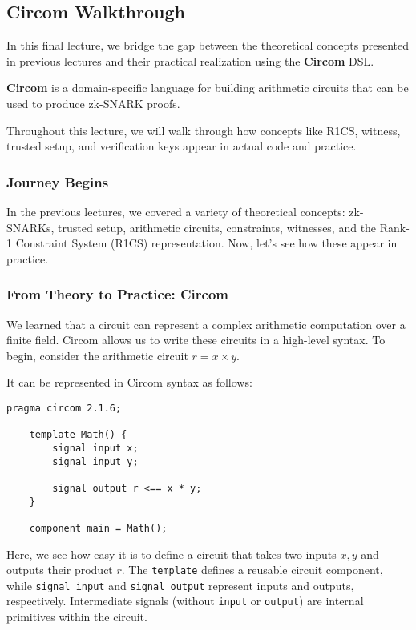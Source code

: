 \documentclass[../lecture-notes-105x135.tex]{subfiles}
\begin{document}
    \subsection{Circom Walkthrough}

    In this final lecture, we bridge the gap between the theoretical concepts presented in previous lectures and their practical realization using the \textbf{Circom} DSL.

    \begin{definition}
        \textbf{Circom} is a domain-specific language for building arithmetic circuits that can be used to produce zk-SNARK proofs.
    \end{definition}

    Throughout this lecture, we will walk through how concepts like R1CS, witness, trusted setup, and verification keys appear in actual code and practice.

    \subsubsection{Journey Begins}

    In the previous lectures, we covered a variety of theoretical concepts: zk-SNARKs, trusted setup, arithmetic circuits, constraints, witnesses, and the Rank-1 Constraint System (R1CS) representation.
    Now, let's see how these appear in practice.

    \subsubsection{From Theory to Practice: Circom}

    We learned that a circuit can represent a complex arithmetic computation over a finite field.
    Circom allows us to write these circuits in a high-level syntax.
    To begin, consider the arithmetic circuit $r = x \times y$.

    It can be represented in Circom syntax as follows:

    \begin{lstlisting}[language=Circom]
    pragma circom 2.1.6;

    template Math() {
        signal input x;
        signal input y;

        signal output r <== x * y;
    }

    component main = Math();
    \end{lstlisting}

    Here, we see how easy it is to define a circuit that takes two inputs $x,y$ and outputs their product $r$.
    The \texttt{template} defines a reusable circuit component, while \texttt{signal input} and \texttt{signal output} represent inputs and outputs, respectively.
    Intermediate signals (without \texttt{input} or \texttt{output}) are internal primitives within the circuit.
\end{document}
